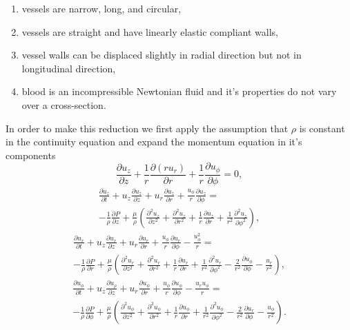 \documentclass[a4paper, oneside]{discothesis}
\begin{document}
\begin{enumerate}
	\item vessels are narrow, long, and circular,
	\item vessels are straight and have linearly elastic compliant walls, 
	\item vessel walls can be displaced slightly in radial direction but not in longitudinal direction,
	\item blood is an incompressible Newtonian fluid and it's properties do not vary over a cross-section.
\end{enumerate}
In order to make this reduction we first apply the assumption that $\rho$ is constant in the continuity equation and expand the momentum equation in it's components
\begin{equation}
	\frac{\partial u_z}{\partial z} + \frac{1}{r} \frac{\partial (ru_r)}{\partial r} + \frac{1}{r}\frac{\partial u_\phi}{\partial \phi} = 0, 
\end{equation}
\begin{multline}
	\frac{\partial u_z}{\partial t} + u_z \frac{\partial u_z}{\partial z} + u_r \frac{\partial u_z}{\partial r} + \frac{u_\phi}{r}\frac{\partial u_z}{\partial \phi} = \\
	-\frac{1}{\rho}\frac{\partial P}{\partial z} + \frac{\mu}{\rho} \left( \frac{\partial^2 u_z}{\partial z^2} + \frac{\partial^2 u_z}{\partial r^2} + \frac{1}{r} \frac{\partial u_z}{\partial r} + \frac{1}{r^2}\frac{\partial^2 u_z}{\partial \phi^2} \right), 
\end{multline}
\begin{multline}
	\frac{\partial u_r}{\partial t} + u_z \frac{\partial u_r}{\partial z} + u_r \frac{\partial u_r}{\partial r} + \frac{u_\phi}{r}\frac{\partial u_r}{\partial \phi} -\frac{u_\phi^2}{r} = \\
	-\frac{1}{\rho}\frac{\partial P}{\partial r} + \frac{\mu}{\rho} \left( \frac{\partial^2 u_r}{\partial z^2} + \frac{\partial^2 u_r}{\partial r^2} + \frac{1}{r} \frac{\partial u_r}{\partial r} + \frac{1}{r^2}\frac{\partial^2 u_r}{\partial \phi^2} -\frac{2}{r^2}\frac{\partial u_\phi}{\partial \phi} - \frac{u_r}{r^2} \right), 
\end{multline}
\begin{multline}
	\frac{\partial u_\phi}{\partial t} + u_z \frac{\partial u_\rho}{\partial z} + u_r \frac{\partial u_\phi}{\partial r} + \frac{u_\phi}{r}\frac{\partial u_\phi}{\partial \phi} -\frac{u_r u_\phi}{r} = \\
	-\frac{1}{\rho}\frac{\partial P}{\partial \phi} + \frac{\mu}{\rho} \left( \frac{\partial^2 u_\phi}{\partial z^2} + \frac{\partial^2 u_\phi}{\partial r^2} + \frac{1}{r} \frac{\partial u_\phi}{\partial r} + \frac{1}{r^2}\frac{\partial^2 u_\phi}{\partial \phi^2} -\frac{2}{r^2}\frac{\partial u_r}{\partial \phi} - \frac{u_\phi}{r^2}\right). \label{eq:momp}
\end{multline}
\end{document}
